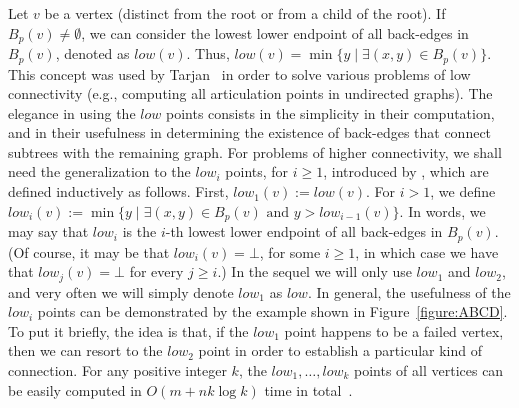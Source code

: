 \documentclass[11pt,a4paper]{article}
\begin{document}
Let $v$ be a vertex (distinct from the root or from a child of the root). If $B_p(v)\neq\emptyset$, we can consider the lowest lower endpoint of all back-edges in $B_p(v)$, denoted as $\mathit{low}(v)$. Thus, $\mathit{low}(v)=\min\{y\mid \exists (x,y)\in B_p(v)\}$. This concept was used by Tarjan~\cite{DBLP:journals/siamcomp/Tarjan72} in order to solve various problems of low connectivity (e.g., computing all articulation points in undirected graphs). The elegance in using the $\mathit{low}$ points consists in the simplicity in their computation, and in their usefulness in determining the existence of back-edges that connect subtrees with the remaining graph. For problems of higher connectivity, we shall need the generalization to the $\mathit{low}_i$ points, for $i\geq 1$, introduced by \cite{DBLP:conf/esa/Kosinas23}, which are defined inductively as follows. First, $\mathit{low}_1(v):= \mathit{low}(v)$. For $i>1$, we define $\mathit{low}_i(v):=\min\{y\mid \exists (x,y)\in B_p(v) \mbox{ and } y>\mathit{low}_{i-1}(v)\}$. In words, we may say that $\mathit{low}_i$ is the $i$-th lowest lower endpoint of all back-edges in $B_p(v)$. (Of course, it may be that $\mathit{low}_i(v)=\bot$, for some $i\geq 1$, in which case we have that $\mathit{low}_j(v)=\bot$ for every $j\geq i$.) In the sequel we will only use $\mathit{low}_1$ and $\mathit{low}_2$, and very often we will simply denote $\mathit{low}_1$ as $\mathit{low}$. In general, the usefulness of the $\mathit{low}_i$ points can be demonstrated by the example shown in Figure~\ref{figure:ABCD}. To put it briefly, the idea is that, if the $\mathit{low}_1$ point happens to be a failed vertex, then we can resort to the $\mathit{low}_2$ point in order to establish a particular kind of connection. For any positive integer $k$, the $\mathit{low}_1,\dots,\mathit{low}_k$ points of all vertices can be easily computed in $O(m+nk\log{k})$ time in total~\cite{DBLP:conf/esa/Kosinas23}. 
\end{document}
